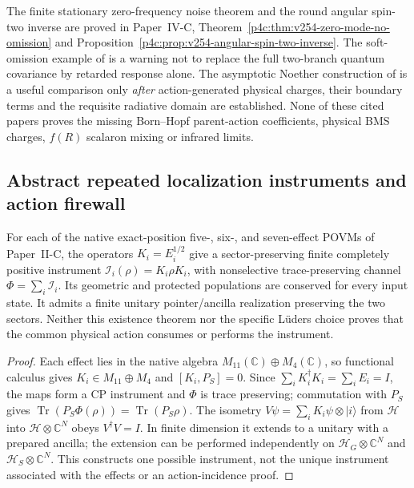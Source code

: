 \documentclass[12pt,a4paper]{article}
\begin{document}
\begin{remark}
The finite stationary zero-frequency noise theorem and the round
angular spin-two inverse are proved in
Paper~IV-C, Theorem~\ref{p4c:thm:v254-zero-mode-no-omission}
and Proposition~\ref{p4c:prop:v254-angular-spin-two-inverse}.
The soft-omission example of \cite{JorstadPasterski2026SoftOmissions}
is a warning not to replace the full two-branch quantum covariance by
retarded response alone. The asymptotic Noether construction of
\cite{Pasterski2023NoetherCurrents} is a useful comparison only
\emph{after} action-generated physical charges, their boundary terms and
the requisite radiative domain are established. None of these cited
papers proves the missing Born--Hopf parent-action coefficients,
physical BMS charges, $f(R)$ scalaron mixing or infrared limits.
\end{remark}

\subsection{Abstract repeated localization instruments and action firewall}
\label{p4b:sec:v266-instrument-existence}
\begin{theorem}
\label{p4b:thm:v266-native-instrument}
For each of the native exact-position five-, six-, and seven-effect
POVMs of Paper~II-C, the operators $K_i=E_i^{1/2}$ give a
sector-preserving finite completely positive instrument
$\mathcal I_i(\rho)=K_i\rho K_i$, with nonselective trace-preserving
channel $\Phi=\sum_i\mathcal I_i$. Its geometric and protected
populations are conserved for every input state. It admits a finite
unitary pointer/ancilla realization preserving the two sectors.
Neither this existence theorem nor the specific L\"uders choice
proves that the common physical action consumes or performs the
instrument.
\end{theorem}
\begin{proof}
Each effect lies in the native algebra
$M_{11}(\mathbb C)\oplus M_4(\mathbb C)$, so functional calculus gives
$K_i\in M_{11}\oplus M_4$ and $[K_i,P_S]=0$.
Since $\sum_iK_i^\dagger K_i=\sum_iE_i=I$, the maps form a CP
instrument and $\Phi$ is trace preserving; commutation with $P_S$
gives $\operatorname{Tr}(P_S\Phi(\rho))=\operatorname{Tr}(P_S\rho)$.
The isometry
$V\psi=\sum_iK_i\psi\otimes|i\rangle$ from $\mathcal H$
into $\mathcal H\otimes\mathbb C^N$ obeys $V^\dagger V=I$.
In finite dimension it extends to a unitary with a prepared ancilla;
the extension can be performed independently on
$\mathcal H_G\otimes\mathbb C^N$ and
$\mathcal H_S\otimes\mathbb C^N$.
This constructs one possible instrument, not the unique instrument
associated with the effects or an action-incidence proof.
\end{proof}
\end{document}
